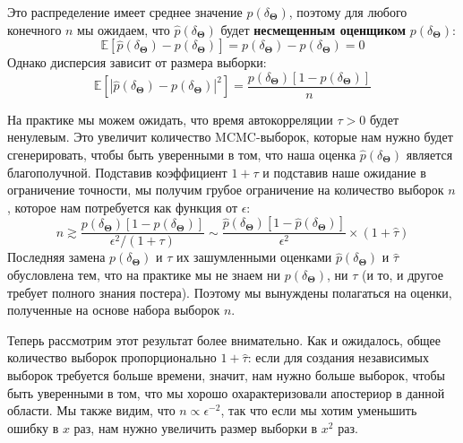 \documentclass[12pt, titlepage]{article}
\newcommand{\mean}[1]{\ensuremath{\mathbb{E}\left[{#1}\right]}}
\newcommand{\params}{\ensuremath{\boldsymbol\Theta}}
\begin{document}
Это распределение имеет среднее значение $p(\delta_{\params})$, поэтому для любого конечного $n$ мы ожидаем, что $\hat{p}(\delta_{\params})$ будет \textbf{несмещенным оценщиком} $p(\delta_{\params})$:
\begin{equation}
    \mean{\hat{p}(\delta_{\params}) - p(\delta_{\params})} 
    = p(\delta_{\params}) - p(\delta_{\params}) = 0
\end{equation}
Однако дисперсия зависит от размера выборки:
\begin{equation}
    \mean{|\hat{p}(\delta_{\params}) - p(\delta_{\params})|^2}
    = \frac{p(\delta_{\params}) \left[1 - p(\delta_{\params})\right]}{n}
\end{equation}

На практике мы можем ожидать, что время автокорреляции $\tau > 0$ будет ненулевым. Это увеличит количество MCMC-выборок, которые нам нужно будет сгенерировать, чтобы быть уверенными в том, что наша оценка $\hat{p}(\delta_{\params})$ является благополучной. Подставив коэффициент $1+\tau$ и подставив наше ожидание в ограничение точности, мы получим грубое ограничение на количество выборок $n$, которое нам потребуется как функция от $\epsilon$:
\begin{equation}
    n \gtrsim 
    \frac{p(\delta_{\params}) \left[1 - p(\delta_{\params})\right]}
    {\epsilon^2/(1+\tau)} 
    \sim \frac{\hat{p}(\delta_{\params}) 
    \left[1 - \hat{p}(\delta_{\params})\right]}
    {\epsilon^2} \times (1+\hat{\tau})
\end{equation}
Последняя замена $p(\delta_{\params})$ и $\tau$ их зашумленными оценками $\hat{p}(\delta_{\params})$ и $\hat{\tau}$ обусловлена тем, что на практике мы не знаем ни $p(\delta_{\params})$, ни $\tau$ (и то, и другое требует полного знания постера). Поэтому мы вынуждены полагаться на оценки, полученные на основе набора выборок $n$.

Теперь рассмотрим этот результат более внимательно. Как и ожидалось, общее количество выборок пропорционально $1 + \hat{\tau}$: если для создания независимых выборок требуется больше времени, значит, нам нужно больше выборок, чтобы быть уверенными в том, что мы хорошо охарактеризовали апостериор в данной области. Мы также видим, что $n \propto \epsilon^{-2}$, так что если мы хотим уменьшить ошибку в $x$ раз, нам нужно увеличить размер выборки в $x^2$ раз.
\end{document}
